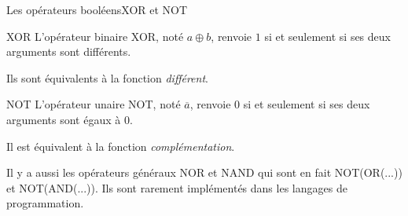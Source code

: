 \begin{frame}{Les opérateurs booléens}{XOR et NOT} 
 \begin{block}{XOR}
    L'opérateur binaire XOR, noté $a\oplus b$, renvoie $1$ si et seulement si ses deux arguments sont différents.

    Ils sont équivalents à la fonction \emph{différent}.
  \end{block}
  \begin{block}{NOT}
    L'opérateur unaire NOT, noté $\overline{a}$, renvoie $0$ si et seulement si ses deux arguments sont égaux à $0$.

    Il est équivalent à la fonction \emph{complémentation}.

    Il y a aussi les opérateurs généraux NOR et NAND qui sont en fait
    NOT(OR(...)) et NOT(AND(...)). Ils sont rarement implémentés dans
    les langages de programmation.
  \end{block}
\end{frame}
